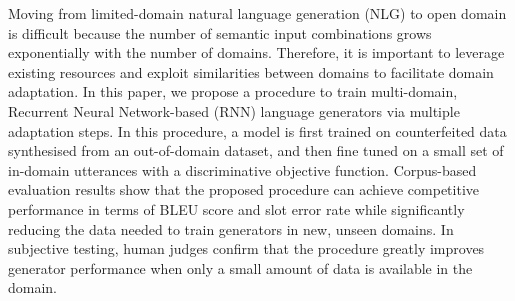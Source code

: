 Moving from limited-domain natural language generation (NLG) to open domain is difficult because the number of semantic input combinations grows exponentially with the number of domains. Therefore, it is important to leverage existing resources and exploit similarities between domains to facilitate domain adaptation. In this paper, we propose a procedure to train multi-domain, Recurrent Neural Network-based (RNN) language generators via multiple adaptation steps. In this procedure, a model is first trained on counterfeited data synthesised from an out-of-domain dataset, and then fine tuned on a small set of in-domain utterances with a discriminative objective function. Corpus-based evaluation results show that the proposed procedure can achieve competitive performance in terms of  BLEU score and slot error rate while significantly reducing the data needed to train generators in new, unseen domains. In subjective testing, human judges confirm that the procedure greatly improves generator performance when only a small amount of data is available in the domain.
